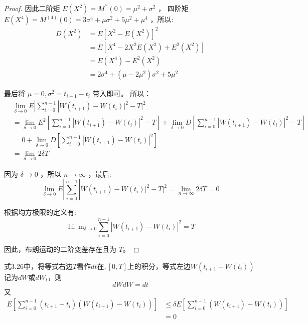 \documentclass[lang=cn,newtx,10pt,scheme=chinese]{elegantbook}
\begin{document}
\begin{proof}
因此二阶矩 $E\left(X^2\right)=M^{\prime \prime}(0)=\mu^2+\sigma^2$ ，
四阶矩 $E\left(X^4\right)=M^{(4)}(0)=3 \sigma^4+\mu \sigma^2+5 \mu^2+\mu^4$ ，所以:
$$
\begin{aligned}
D\left(X^2\right) & =E\left[X^2-E\left(X^2\right)\right]^2 \\
& =E\left[X^4-2 X^2 E\left(X^2\right)+E^2\left(X^2\right)\right] \\
& =E\left(X^4\right)-E^2\left(X^2\right) \\
& =2 \sigma^4+\left(\mu-2 \mu^2\right) \sigma^2+5 \mu^2
\end{aligned}
$$

最后将 $\mu=0, \sigma^2=t_{i+1}-t_i$ 带入即可。
所以：
$$
\begin{aligned}
& \lim _{\delta \rightarrow 0} E\left|\sum_{i=0}^{n-1}\right| W\left(t_{i+1}\right)-\left.W\left(t_i\right)\right|^2-\left.T\right|^2 \\
& =\lim _{\delta \rightarrow 0} E^2\left[\sum_{i=0}^{n-1}\left|W\left(t_{i+1}\right)-W\left(t_i\right)\right|^2-T\right]+\lim _{\delta \rightarrow 0} D\left[\sum_{i=0}^{n-1}\left|W\left(t_{i+1}\right)-W\left(t_i\right)\right|^2-T\right] \\
& =0+\lim _{\delta \rightarrow 0} D\left[\sum_{i=0}^{n-1}\left|W\left(t_{i+1}\right)-W\left(t_i\right)\right|^2\right] \\
& =\lim _{\delta \rightarrow 0} 2 \delta T
\end{aligned}
$$

因为 $\delta \rightarrow 0$ ，所以 $n \rightarrow \infty$ ，最后:
$$
\lim _{\delta \rightarrow 0} E\left|\sum_{i=0}^{n-1}\right| W\left(t_{i+1}\right)-\left.W\left(t_i\right)\right|^2-\left.T\right|^2=\lim _{n \rightarrow \infty} 2 \delta T=0
$$

根据均方极限的定义有:
\begin{equation}
  \text { l.i. } \mathrm{m}_{\delta \rightarrow 0} \sum_{i=0}^{n-1}\left|W\left(t_{i+1}\right)-W\left(t_i\right)\right|^2=T
\end{equation}

因此，布朗运动的二阶变差存在且为 $T$。
\end{proof}

式3.26中，将等式右边$T$看作$dt \text{在}, [0, T]$上的积分，等式左边$W(t_{i+1} - W(t_i))$记为$dW \text{或}dW_t$，则
\begin{equation}
  dW dW = dt
\end{equation}
又 
$$
\begin{aligned}
E\left[\sum_{i=0}^{n-1}\left(t_{i+1}-t_i\right)\left(W\left(t_{i+1}\right)-W\left(t_i\right)\right)\right] & \leq \delta E\left[\sum_{i=0}^{n-1}\left(W\left(t_{i+1}\right)-W\left(t_i\right)\right)\right] \\
& =0
\end{aligned}
$$
\end{document}
